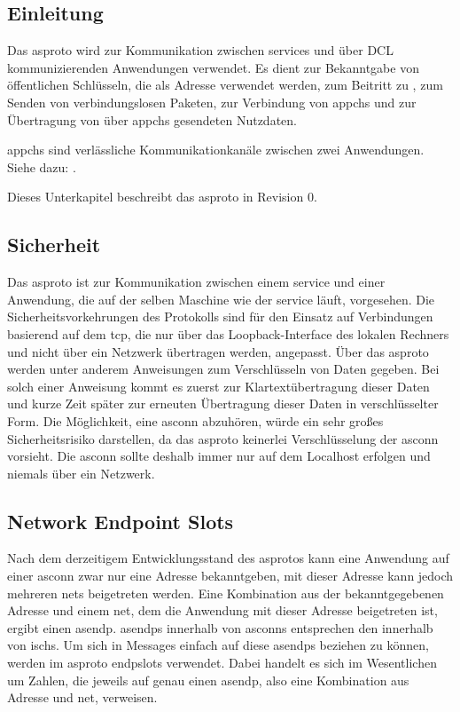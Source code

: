 
\subsection{Einleitung}
Das \gls{asproto} wird zur Kommunikation zwischen \glspl{service} und über DCL
kommunizierenden Anwendungen verwendet. Es dient zur Bekanntgabe von
öffentlichen Schlüsseln, die als Adresse verwendet werden, zum Beitritt zu
, zum Senden von verbindungslosen Paketen, zur
Verbindung von \glspl{appch} und zur Übertragung von über \glspl{appch}
gesendeten Nutzdaten.

\Glspl{appch} sind verlässliche Kommunikationkanäle zwischen zwei Anwendungen.
Siehe dazu: .

Dieses Unterkapitel beschreibt das \gls{asproto} in Revision 0.

\subsection{Sicherheit}
Das \gls{asproto} ist zur Kommunikation zwischen einem \gls{service} und einer
Anwendung, die auf der selben Maschine wie der \gls{service} läuft, vorgesehen.
Die Sicherheitsvorkehrungen des Protokolls sind für den Einsatz auf
Verbindungen basierend auf dem \acrfull{tcp}, die nur über das
Loopback-Interface des lokalen Rechners und nicht über ein Netzwerk übertragen
werden, angepasst.
Über das \gls{asproto} werden unter anderem Anweisungen zum Verschlüsseln von
Daten gegeben.
Bei solch einer Anweisung kommt es zuerst zur Klartextübertragung dieser Daten
und kurze Zeit später zur erneuten Übertragung dieser Daten in verschlüsselter
Form.
Die Möglichkeit, eine \gls{asconn} abzuhören, würde ein sehr großes
Sicherheitsrisiko darstellen, da das \gls{asproto} keinerlei Verschlüsselung
der \gls{asconn} vorsieht.
Die \gls{asconn} sollte deshalb immer nur auf dem Localhost erfolgen und niemals
über ein Netzwerk.

\subsection{Network Endpoint Slots}
Nach dem derzeitigem Entwicklungsstand des \gls{asproto}s kann eine Anwendung
auf einer \gls{asconn} zwar nur eine Adresse bekanntgeben, mit dieser Adresse
kann jedoch mehreren \glspl{net} beigetreten werden.
Eine Kombination aus der bekanntgegebenen Adresse und einem \gls{net}, dem die
Anwendung mit dieser Adresse beigetreten ist, ergibt einen \gls{asendp}.
\glspl{asendp} innerhalb von \glspl{asconn} entsprechen den
 innerhalb von \glspl{isch}.
Um sich in Messages einfach auf diese \glspl{asendp} beziehen zu können, werden
im \gls{asproto} \glspl{endpslot} verwendet. Dabei handelt es sich im
Wesentlichen um Zahlen, die jeweils auf genau einen \gls{asendp}, also eine
Kombination aus Adresse und \gls{net}, verweisen.

